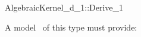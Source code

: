 \begin{ccRefConcept}{AlgebraicKernel_d_1::Derive_1}

\ccDefinition


A model \ccVar\ of this type must provide:

{}

\end{ccRefConcept}
